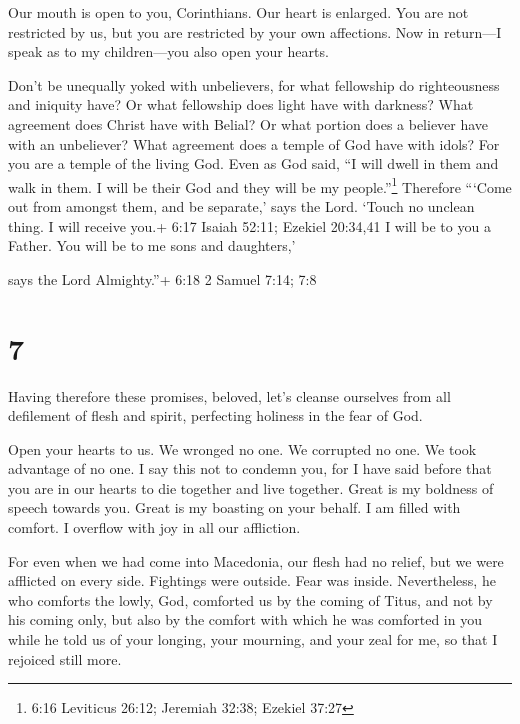  Our mouth is open to you, Corinthians. Our heart is
enlarged.  You are not restricted by us, but you are
restricted by your own affections.  Now in return---I speak
as to my children---you also open your hearts.

 Don't be unequally yoked with unbelievers, for what
fellowship do righteousness and iniquity have? Or what fellowship does
light have with darkness?  What agreement does Christ have
with Belial? Or what portion does a believer have with an unbeliever?
 What agreement does a temple of God have with idols? For
you are a temple of the living God. Even as God said, ``I will dwell in
them and walk in them. I will be their God and they will be my
people.''\footnote{6:16 Leviticus 26:12; Jeremiah 32:38; Ezekiel 37:27}
 Therefore ```Come out from amongst them, and be separate,'
says the Lord. `Touch no unclean thing. I will receive you.+ 6:17 Isaiah
52:11; Ezekiel 20:34,41  I will be to you a Father. You
will be to me sons and daughters,'

says the Lord Almighty.''+ 6:18 2 Samuel 7:14; 7:8

\hypertarget{section-6}{%
\section{7}\label{section-6}}

 Having therefore these promises, beloved, let's cleanse
ourselves from all defilement of flesh and spirit, perfecting holiness
in the fear of God.

 Open your hearts to us. We wronged no one. We corrupted no
one. We took advantage of no one.  I say this not to condemn
you, for I have said before that you are in our hearts to die together
and live together.  Great is my boldness of speech towards
you. Great is my boasting on your behalf. I am filled with comfort. I
overflow with joy in all our affliction.

 For even when we had come into Macedonia, our flesh had no
relief, but we were afflicted on every side. Fightings were outside.
Fear was inside.  Nevertheless, he who comforts the lowly,
God, comforted us by the coming of Titus,  and not by his
coming only, but also by the comfort with which he was comforted in you
while he told us of your longing, your mourning, and your zeal for me,
so that I rejoiced still more.

